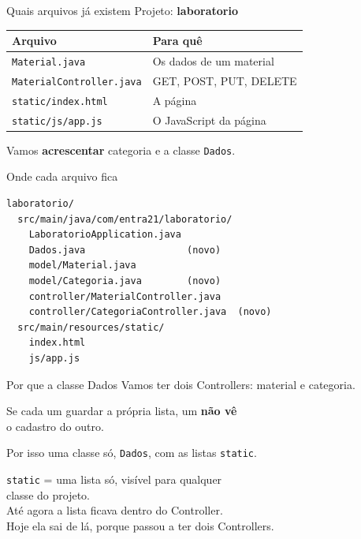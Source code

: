 \documentclass[aspectratio=169,11pt]{beamer}
\begin{document}
\begin{frame}{Quais arquivos já existem}
  Projeto: \textbf{laboratorio}

  \vspace{0.4em}
  \begin{center}
  \begin{tabular}{ll}
    \toprule
    Arquivo & Para quê \\
    \midrule
    \texttt{Material.java} & Os dados de um material \\
    \texttt{MaterialController.java} & GET, POST, PUT, DELETE \\
    \texttt{static/index.html} & A página \\
    \texttt{static/js/app.js} & O JavaScript da página \\
    \bottomrule
  \end{tabular}
  \end{center}

  \vspace{0.5em}
  Vamos \textbf{acrescentar} categoria e a classe \texttt{Dados}.
\end{frame}

\begin{frame}[fragile]{Onde cada arquivo fica}
\begin{lstlisting}[basicstyle=\ttfamily\footnotesize]
laboratorio/
  src/main/java/com/entra21/laboratorio/
    LaboratorioApplication.java
    Dados.java                  (novo)
    model/Material.java
    model/Categoria.java        (novo)
    controller/MaterialController.java
    controller/CategoriaController.java  (novo)
  src/main/resources/static/
    index.html
    js/app.js
\end{lstlisting}
\end{frame}

\begin{frame}{Por que a classe Dados}
  Vamos ter dois Controllers: material e categoria.

  \vspace{0.5em}
  Se cada um guardar a própria lista, um \textbf{não vê}\\
  o cadastro do outro.

  \vspace{0.5em}
  Por isso uma classe só, \texttt{Dados}, com as listas
  \texttt{static}.

  \vspace{0.5em}
  \texttt{static} = uma lista só, visível para qualquer\\
  classe do projeto.\\
  Até agora a lista ficava dentro do Controller.\\
  Hoje ela sai de lá, porque passou a ter dois Controllers.
\end{frame}
\end{document}
